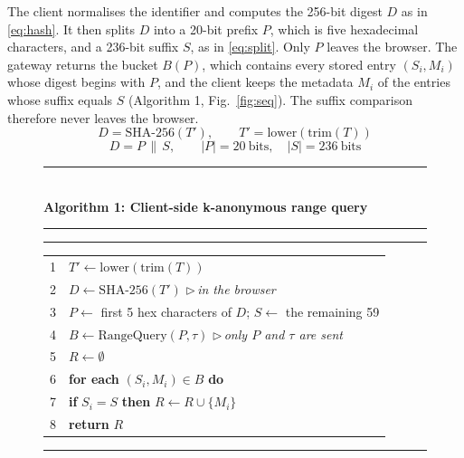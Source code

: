 \documentclass[10pt,twocolumn]{article}
\makeatletter
\newcommand{\algtop}[1]{\noindent\rule{\columnwidth}{0.6pt}\\[1pt]{\footnotesize\textbf{#1}}\\[-1pt]\rule{\columnwidth}{0.4pt}}
\newcommand{\algmid}{\noindent\rule{\columnwidth}{0.4pt}}
\newcommand{\algbot}{\noindent\rule{\columnwidth}{0.6pt}}
\newcommand{\cmt}[1]{\hfill$\triangleright$\,\textit{#1}}
\newcommand{\algtab}[1]{\par\vspace{1pt}\noindent\begin{tabular}{@{}r@{\hspace{5pt}}p{0.9\columnwidth}@{}}#1\end{tabular}\par}
\makeatother
\begin{document}
The client normalises the identifier and computes the 256-bit digest $D$ as in \eqref{eq:hash}. It then splits $D$ into a 20-bit prefix $P$, which is five hexadecimal characters, and a 236-bit suffix $S$, as in \eqref{eq:split}. Only $P$ leaves the browser. The gateway returns the bucket $B(P)$, which contains every stored entry $(S_i, M_i)$ whose digest begins with $P$, and the client keeps the metadata $M_i$ of the entries whose suffix equals $S$ (Algorithm 1, Fig.~\ref{fig:seq}). The suffix comparison therefore never leaves the browser.
\begin{equation}
D=\mathrm{SHA\text{-}256}(T'),\qquad T'=\mathrm{lower}(\mathrm{trim}(T))
\label{eq:hash}
\end{equation}
\begin{equation}
D=P\,\|\,S,\qquad |P|=20\ \text{bits},\quad |S|=236\ \text{bits}
\label{eq:split}
\end{equation}

\begin{figure}[!t]
\algtop{Algorithm 1: Client-side k-anonymous range query}
\par\vspace{1pt}
\algmid
{\footnotesize
\algtab{
1 & $T' \leftarrow \mathrm{lower}(\mathrm{trim}(T))$\\
2 & $D \leftarrow \mathrm{SHA\text{-}256}(T')$ \cmt{in the browser}\\
3 & $P \leftarrow$ first 5 hex characters of $D$; $S \leftarrow$ the remaining 59\\
4 & $B \leftarrow \mathrm{RangeQuery}(P,\tau)$ \cmt{only $P$ and $\tau$ are sent}\\
5 & $R \leftarrow \emptyset$\\
6 & \textbf{for each} $(S_i,M_i)\in B$ \textbf{do}\\
7 & \hspace{1em}\textbf{if} $S_i = S$ \textbf{then} $R \leftarrow R\cup\{M_i\}$\\
8 & \textbf{return} $R$}}
\algbot
\end{figure}
\end{document}
